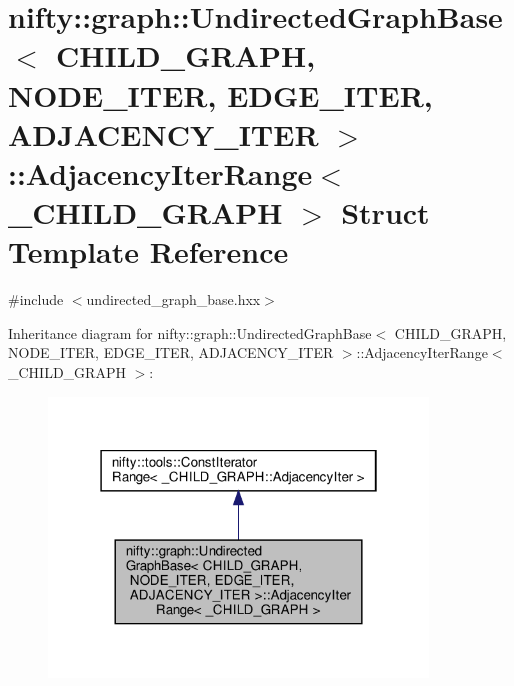 \hypertarget{structnifty_1_1graph_1_1UndirectedGraphBase_1_1AdjacencyIterRange}{}\section{nifty\+:\+:graph\+:\+:Undirected\+Graph\+Base$<$ C\+H\+I\+L\+D\+\_\+\+G\+R\+A\+PH, N\+O\+D\+E\+\_\+\+I\+T\+ER, E\+D\+G\+E\+\_\+\+I\+T\+ER, A\+D\+J\+A\+C\+E\+N\+C\+Y\+\_\+\+I\+T\+ER $>$\+:\+:Adjacency\+Iter\+Range$<$ \+\_\+\+C\+H\+I\+L\+D\+\_\+\+G\+R\+A\+PH $>$ Struct Template Reference}
\label{structnifty_1_1graph_1_1UndirectedGraphBase_1_1AdjacencyIterRange}


{\ttfamily \#include $<$undirected\+\_\+graph\+\_\+base.\+hxx$>$}



Inheritance diagram for nifty\+:\+:graph\+:\+:Undirected\+Graph\+Base$<$ C\+H\+I\+L\+D\+\_\+\+G\+R\+A\+PH, N\+O\+D\+E\+\_\+\+I\+T\+ER, E\+D\+G\+E\+\_\+\+I\+T\+ER, A\+D\+J\+A\+C\+E\+N\+C\+Y\+\_\+\+I\+T\+ER $>$\+:\+:Adjacency\+Iter\+Range$<$ \+\_\+\+C\+H\+I\+L\+D\+\_\+\+G\+R\+A\+PH $>$\+:
\nopagebreak
\begin{figure}[H]
\begin{center}
\leavevmode
\includegraphics[width=286pt]{structnifty_1_1graph_1_1UndirectedGraphBase_1_1AdjacencyIterRange__inherit__graph}
\end{center}
\end{figure}


